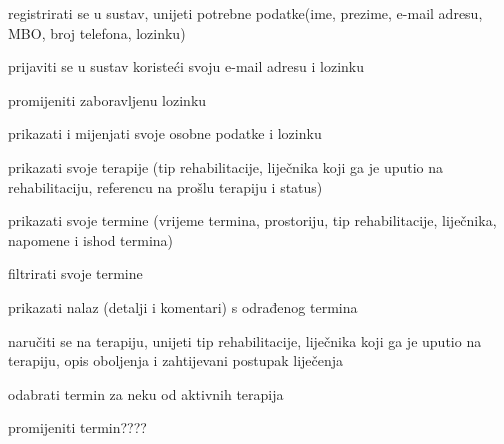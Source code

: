 			
			\begin{packed_enum}
				\item  {}
				\begin{packed_enum}
					\item registrirati se u sustav, unijeti potrebne podatke(ime, prezime, e-mail adresu, MBO, broj telefona, lozinku)
				\end{packed_enum}
			
				\item  {}
				\begin{packed_enum}
					\item prijaviti se u sustav koristeći svoju e-mail adresu i lozinku
					\item promijeniti zaboravljenu lozinku
				\end{packed_enum}
				
				\item  {}
				\begin{packed_enum}
					\item prikazati i mijenjati svoje osobne podatke i lozinku
					\item prikazati svoje terapije (tip rehabilitacije, liječnika koji ga je uputio na rehabilitaciju, referencu na prošlu terapiju i status)
					\item prikazati svoje termine (vrijeme termina, prostoriju, tip rehabilitacije, liječnika, napomene i ishod termina) 
					\item filtrirati svoje termine
					\item prikazati nalaz (detalji i komentari) s odrađenog termina
					\item naručiti se na terapiju, unijeti tip rehabilitacije, liječnika koji ga je uputio na terapiju, opis oboljenja i zahtijevani postupak liječenja
					\item odabrati termin za neku od aktivnih terapija
					\item promijeniti termin????
				\end{packed_enum}
				

\end{packed_enum}

